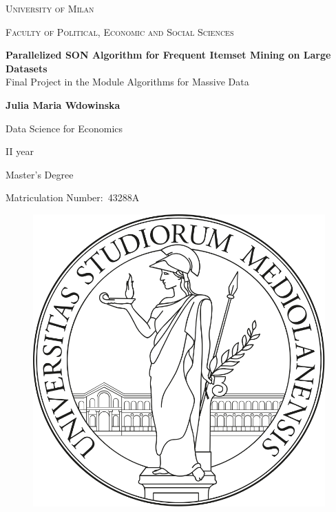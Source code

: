 \documentclass{Class/julia}
\author{Julia Maria Wdowinska}
\date{} %
\begin{document}
\begin{titlepage}
    \centering
    \vfill
    {\scshape\Large University of Milan \par}
    \vspace{0.5cm}
    {\scshape\large Faculty of Political, Economic and Social Sciences \par}
    \vspace{3cm}
    {\huge
    \textbf{Parallelized SON Algorithm for Frequent Itemset Mining on Large Datasets} \\
    \vspace{0.5cm}
    \large Final Project in the Module Algorithms for Massive Data \par}
    \vspace{2cm}
    {\large \textbf{Julia Maria Wdowinska} \par}
    \vspace{0.5cm}
    {\large Data Science for Economics \par}
    {\large II year\par}
    {\large Master’s Degree \par}
    {\large Matriculation Number:\ 43288A \par}
\vfill
\begin{center}
\begin{figure}[h!]\centering
 \includegraphics[keepaspectratio=true,scale=0.2]{logo} \\

\end{figure}
\end{center}
\end{titlepage}
\end{document}
